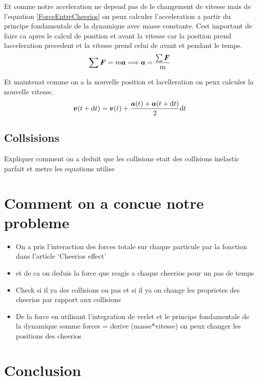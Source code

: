 \documentclass[a4paper, 11pt, oneside]{article} %
\newcommand{\dd}[1]{\mathrm{d}#1}
\begin{document}
    Et comme notre acceleration ne depend pas de le changement de vitesse mais de l'equation \ref{ForceEntreCheerios} on peux calculer l'acceleration a partir du principe fondamentale de la dynamique avec masse constante. Cest important de faire ca apres le calcul de position et avant la vitesse car la position prend lacceleration precedent et la vitesse prend celui de avant et pendant le temps.
    \begin{equation}
        \label{PFD}
        \sum  \vb*{F} = m\vb*{a} \Longrightarrow \vb*{a} = \frac{\sum \vb*{F}}{m}
    \end{equation}

    Et maintenat comme on a la nouvelle position et lacelleration on peux calculer la nouvelle vitesse.
    \begin{equation}
        \label{veletVitesse}
        \vb*{v}(t+\dd t) = \vb*{v}(t)+\frac{\vb*{a}(t)+\vb*{a}(t+\dd t)}{2}\dd t 
    \end{equation}



    \subsection{Collsisions}
    Expliquer comment on a deduit que les collisions etait des collisions inelastic parfait et metre les equations utilise

\section{Comment on a concue notre probleme}
    \begin{itemize}
        \item On a pris l'interaction des forces totale sur chaque particule par la fonction dans l'article `Cheerios effect'
        \item et de ca on deduis la force que reagis a chaque cheerios pour un pas de temps 
        \item Check si il ya des collisions ou pas et si il ya on change les proprietes des cheerios par rapport aux collisions
        \item De la force en utilisant l'integration de verlet et le principe fondamentale de la dynamique somme forces = derive (masse*vitesse) on peux changer les positions des cheerios
    \end{itemize}
\section*{Conclusion}

\newpage
\thispagestyle{empty}
\nocite{*}
\printbibliography[title = Bibliographie]
\end{document}
